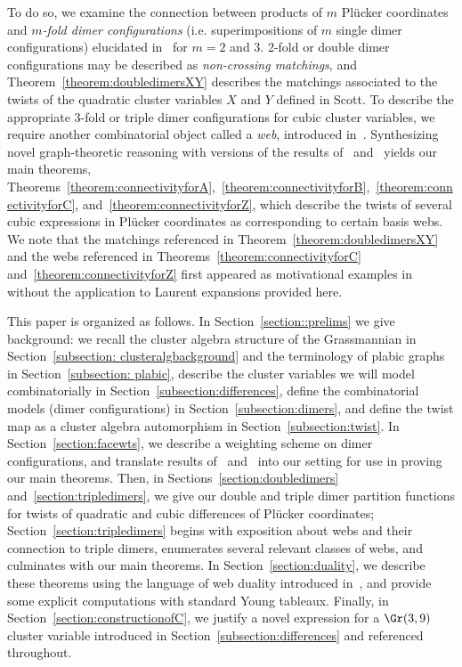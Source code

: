 To do so, we examine the connection between products of $m$ Pl\"ucker coordinates and \textit{$m$-fold dimer configurations} (i.e. superimpositions of $m$ single dimer configurations) elucidated in~\cite{lam2015} for $m=2$ and $3$. 2-fold or double dimer configurations may be described as \textit{non-crossing matchings}, and Theorem~\ref{theorem:doubledimersXY} describes the matchings associated to the twists of the quadratic cluster variables $X$ and $Y$ defined in Scott. 
To describe the appropriate 3-fold or triple dimer configurations for cubic cluster variables, we require another combinatorial object called a \textit{web}, introduced in~\cite{kup96}. Synthesizing novel graph-theoretic reasoning with versions of the results of~\cite{marshscott2016} and~\cite{mullerspeyer} yields our main theorems, Theorems~\ref{theorem:connectivityforA},~\ref{theorem:connectivityforB},~\ref{theorem:connectivityforC}, and~\ref{theorem:connectivityforZ}, which describe the twists of several cubic expressions in Pl\"ucker coordinates as corresponding to certain basis webs. We note that the matchings referenced in Theorem~\ref{theorem:doubledimersXY} and the webs referenced in Theorems~\ref{theorem:connectivityforC} and~\ref{theorem:connectivityforZ} first appeared as motivational examples in~\cite{fll2019} without the application to Laurent expansions provided here.


This paper is organized as follows. In Section~\ref{section::prelims} we give background: we recall the cluster algebra structure of the Grassmannian in Section~\ref{subsection: clusteralgbackground} and the terminology of plabic graphs in Section~\ref{subsection: plabic}, describe the cluster variables we will model combinatorially in Section~\ref{subsection:differences}, define the combinatorial models (dimer configurations) in Section~\ref{subsection:dimers}, and define the twist map as a cluster algebra automorphism in Section~\ref{subsection:twist}. In Section~\ref{section:facewts}, we describe a weighting scheme on dimer configurations, and translate results of~\cite{marshscott2016} and~\cite{mullerspeyer} into our setting for use in proving our main theorems. Then, in Sections~\ref{section:doubledimers} and~\ref{section:tripledimers}, we give our double and triple dimer partition functions for twists of quadratic and cubic differences of Pl\"ucker coordinates; Section~\ref{section:tripledimers} begins with exposition about webs and their connection to triple dimers, enumerates several relevant classes of webs, and culminates with our main theorems.
In Section~\ref{section:duality}, we describe these theorems using the language of web duality introduced in~\cite{fll2019}, and provide some explicit computations with standard Young tableaux. 
Finally, in Section~\ref{section:constructionofC}, we justify a novel expression for a $\Gr(3,9)$ cluster variable introduced in Section~\ref{subsection:differences} and referenced throughout.

